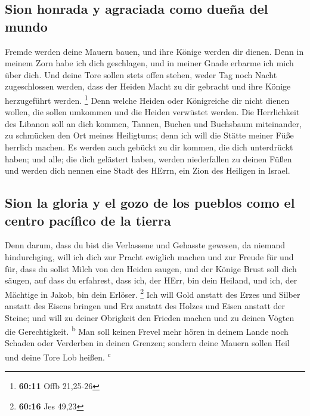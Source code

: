 \hypertarget{sion-honrada-y-agraciada-como-dueuxf1a-del-mundo}{%
\subsection{Sion honrada y agraciada como dueña del
mundo}\label{sion-honrada-y-agraciada-como-dueuxf1a-del-mundo}}

 Fremde werden deine Mauern bauen, und ihre Könige werden
dir dienen. Denn in meinem Zorn habe ich dich geschlagen, und in meiner
Gnade erbarme ich mich über dich.  Und deine Tore sollen
stets offen stehen, weder Tag noch Nacht zugeschlossen werden, dass der
Heiden Macht zu dir gebracht und ihre Könige herzugeführt werden.
\footnote{\textbf{60:11} Offb 21,25-26}  Denn welche
Heiden oder Königreiche dir nicht dienen wollen, die sollen umkommen und
die Heiden verwüstet werden.  Die Herrlichkeit des
Libanon soll an dich kommen, Tannen, Buchen und Buchsbaum miteinander,
zu schmücken den Ort meines Heiligtums; denn ich will die Stätte meiner
Füße herrlich machen.  Es werden auch gebückt zu dir
kommen, die dich unterdrückt haben; und alle; die dich gelästert haben,
werden niederfallen zu deinen Füßen und werden dich nennen eine Stadt
des HErrn, ein Zion des Heiligen in Israel.

\hypertarget{sion-la-gloria-y-el-gozo-de-los-pueblos-como-el-centro-pacuxedfico-de-la-tierra}{%
\subsection{Sion la gloria y el gozo de los pueblos como el centro
pacífico de la
tierra}\label{sion-la-gloria-y-el-gozo-de-los-pueblos-como-el-centro-pacuxedfico-de-la-tierra}}

 Denn darum, dass du bist die Verlassene und Gehasste
gewesen, da niemand hindurchging, will ich dich zur Pracht ewiglich
machen und zur Freude für und für,  dass du sollst Milch
von den Heiden saugen, und der Könige Brust soll dich säugen, auf dass
du erfahrest, dass ich, der HErr, bin dein Heiland, und ich, der
Mächtige in Jakob, bin dein Erlöser. \footnote{\textbf{60:16} Jes 49,23}
 Ich will Gold anstatt des Erzes und Silber anstatt des
Eisens bringen und Erz anstatt des Holzes und Eisen anstatt der Steine;
und will zu deiner Obrigkeit den Frieden machen und zu deinen Vögten die
Gerechtigkeit. \textsuperscript{b}  Man soll keinen
Frevel mehr hören in deinem Lande noch Schaden oder Verderben in deinen
Grenzen; sondern deine Mauern sollen Heil und deine Tore Lob heißen.
\textsuperscript{c}

